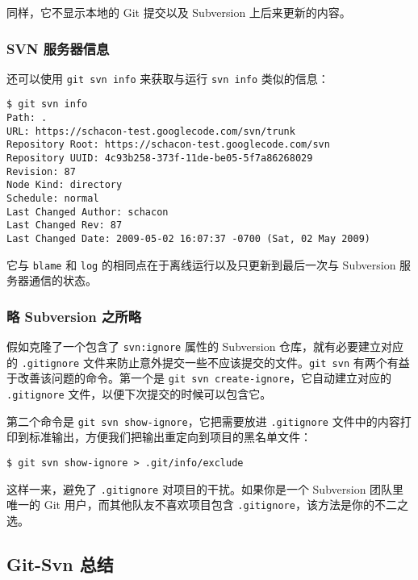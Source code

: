 \documentclass[a4paper]{book}
\begin{document}
同样，它不显示本地的 Git 提交以及 Subversion 上后来更新的内容。

\subsubsection{SVN 服务器信息}

还可以使用 \texttt{git svn info} 来获取与运行 \texttt{svn info} 类似的信息：

\begin{shaded}\begin{verbatim}
$ git svn info
Path: .
URL: https://schacon-test.googlecode.com/svn/trunk
Repository Root: https://schacon-test.googlecode.com/svn
Repository UUID: 4c93b258-373f-11de-be05-5f7a86268029
Revision: 87
Node Kind: directory
Schedule: normal
Last Changed Author: schacon
Last Changed Rev: 87
Last Changed Date: 2009-05-02 16:07:37 -0700 (Sat, 02 May 2009)
\end{verbatim}\end{shaded}

它与 \texttt{blame} 和 \texttt{log} 的相同点在于离线运行以及只更新到最后一次与 Subversion 服务器通信的状态。

\subsubsection{略 Subversion 之所略}

假如克隆了一个包含了 \texttt{svn:ignore} 属性的 Subversion 仓库，就有必要建立对应的 \texttt{.gitignore} 文件来防止意外提交一些不应该提交的文件。\texttt{git svn} 有两个有益于改善该问题的命令。第一个是 \texttt{git svn create-ignore}，它自动建立对应的 \texttt{.gitignore} 文件，以便下次提交的时候可以包含它。

第二个命令是 \texttt{git svn show-ignore}，它把需要放进 \texttt{.gitignore} 文件中的内容打印到标准输出，方便我们把输出重定向到项目的黑名单文件：

\begin{shaded}\begin{verbatim}
$ git svn show-ignore > .git/info/exclude
\end{verbatim}\end{shaded}

这样一来，避免了 \texttt{.gitignore} 对项目的干扰。如果你是一个 Subversion 团队里唯一的 Git 用户，而其他队友不喜欢项目包含 \texttt{.gitignore}，该方法是你的不二之选。

\subsection{Git-Svn 总结}
\end{document}
